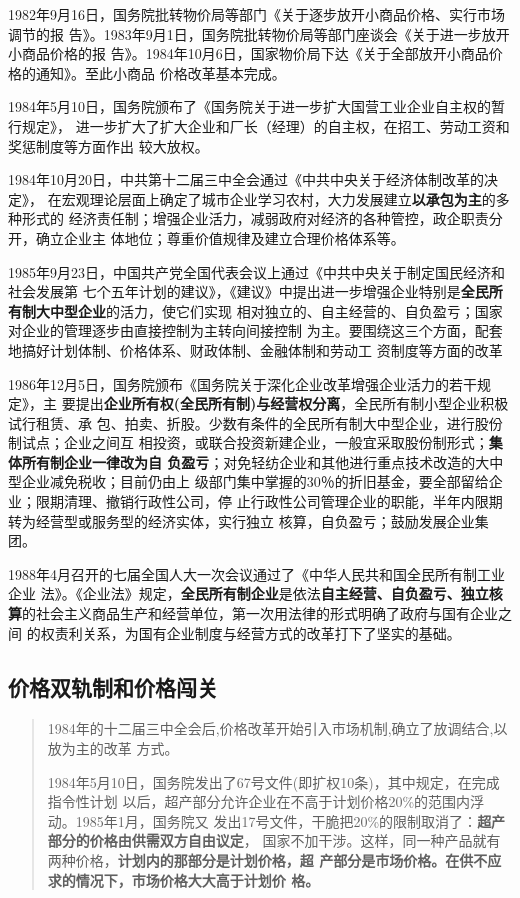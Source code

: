 1982年9月16日，国务院批转物价局等部门《关于逐步放开小商品价格、实行市场调节的报
告》。1983年9月1日，国务院批转物价局等部门座谈会《关于进一步放开小商品价格的报
告》。1984年10月6日，国家物价局下达《关于全部放开小商品价格的通知》。至此小商品
价格改革基本完成。\cite[442-443]{fengyunshi1b}


1984年5月10日，国务院颁布了《国务院关于进一步扩大国营工业企业自主权的暂行规定》，
进一步扩大了扩大企业和厂长（经理）的自主权，在招工、劳动工资和奖惩制度等方面作出
较大放权。

1984年10月20日，中共第十二届三中全会通过《中共中央关于经济体制改革的决定》，
在宏观理论层面上确定了城市企业学习农村，大力发展建立\textbf{以承包为主}的多种形式的
经济责任制；增强企业活力，减弱政府对经济的各种管控，政企职责分开，确立企业主
体地位；尊重价值规律及建立合理价格体系等。

1985年9月23日，中国共产党全国代表会议上通过《中共中央关于制定国民经济和社会发展第
七个五年计划的建议》，《建议》中提出进一步增强企业特别是\textbf{全民所有制大中型企业}的活力，使它们实现
相对独立的、自主经营的、自负盈亏；国家对企业的管理逐步由直接控制为主转向间接控制
为主。要围绕这三个方面，配套地搞好计划体制、价格体系、财政体制、金融体制和劳动工
资制度等方面的改革

1986年12月5日，国务院颁布《国务院关于深化企业改革增强企业活力的若干规定》，主
要提出\textbf{企业所有权(全民所有制)与经营权分离}，全民所有制小型企业积极试行租赁、承
包、拍卖、折股。少数有条件的全民所有制大中型企业，进行股份制试点；企业之间互
相投资，或联合投资新建企业，一般宜采取股份制形式；\textbf{集体所有制企业一律改为自
  负盈亏}；对免轻纺企业和其他进行重点技术改造的大中型企业减免税收；目前仍由上
级部门集中掌握的30％的折旧基金，要全部留给企业；限期清理、撤销行政性公司，停
止行政性公司管理企业的职能，半年内限期转为经营型或服务型的经济实体，实行独立
核算，自负盈亏；鼓励发展企业集团。

1988年4月召开的七届全国人大一次会议通过了《中华人民共和国全民所有制工业企业
法》。《企业法》规定，\textbf{全民所有制企业}是依法\textbf{自主经营、自负盈亏、独立核
  算}的社会主义商品生产和经营单位，第一次用法律的形式明确了政府与国有企业之间
的权责利关系，为国有企业制度与经营方式的改革打下了坚实的基础。


\subsection{价格双轨制和价格闯关}
\label{sec:qishuanggui}

\begin{quotation}
  1984年的十二届三中全会后,价格改革开始引入市场机制,确立了放调结合,以放为主的改革
  方式。\cite{wangqiangshehui}

  1984年5月10日，国务院发出了67号文件(即扩权10条)，其中规定，在完成指令性计划
  以后，超产部分允许企业在不高于计划价格20\%的范围内浮动。1985年1月，国务院又
  发出17号文件，干脆把20\%的限制取消了：\textbf{超产部分的价格由供需双方自由议定}，
  国家不加干涉。这样，同一种产品就有两种价格，\textbf{计划内的那部分是计划价格，超
    产部分是市场价格。在供不应求的情况下，市场价格大大高于计划价
    格。}\cite{yangshuanggui}
\end{quotation}

